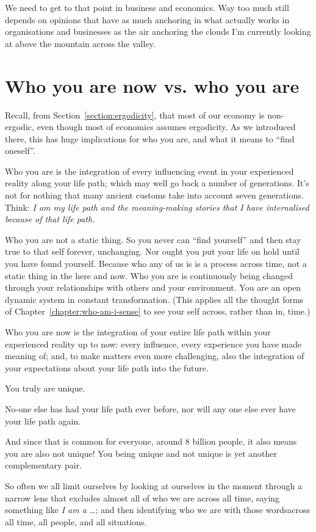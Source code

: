 We need to get to that point in business and economics. Way too much still depends on opinions that have as much anchoring in what actually works in organisations and businesses as the air anchoring the clouds I'm currently looking at above the mountain across the valley.
\section{Who you are now vs. who you are}
\label{sec:who-am-i}
Recall, from Section~\ref{section:ergodicity}, that most of our economy is non-ergodic, even though most of economics assumes ergodicity. As we introduced there, this has huge implications for who you are, and what it means to “find oneself”.


Who you are is the integration of every influencing event in your experienced reality along your life path; which may well go back a number of generations. It's not for nothing that many ancient customs take into account seven generations. Think: \emph{I am my life path and the meaning-making stories that I have internalised because of that life path.} 


Who you are not a static thing. So you never can “find yourself” and then stay true to that self forever, unchanging. Nor ought you put your life on hold until you have found yourself. Because who any of us is is a process across time, not a static thing in the here and now. Who you are is continuously being changed through your relationships with others and your environment. You are an open dynamic system in constant transformation. (This applies all the thought forms of Chapter~\ref{chapter:who-am-i-sense} to see your self across, rather than in, time.)


Who you are now is the integration of your entire life path within your experienced reality up to now: every influence, every experience you have made meaning of; and, to make matters even more challenging, also the integration of your expectations about your life path into the future.


You truly are unique.


No-one else has had your life path ever before, nor will any one else ever have your life path again. 


And since that is common for everyone, around 8 billion people, it also means you are also not unique! You being unique and not unique is yet another complementary pair.


So often we all limit ourselves by looking at ourselves in the moment through a narrow lens that excludes almost all of who we are across all time, saying something like \emph{I am a \ldots}; and then identifying who we are with those words\textemdash across all time, all people, and all situations.


